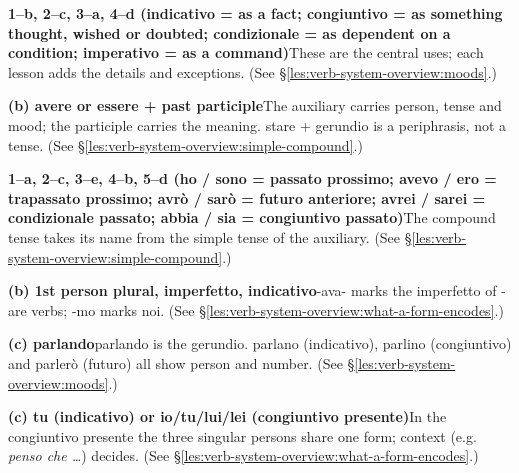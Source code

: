 \documentclass[11pt,a4paper,twoside,openright]{book}
\newcommand{\answerheading}[1]{\par\medskip\noindent{\sffamily\bfseries\small #1}\par\nopagebreak}
\begin{document}
\answerheading{\S\ref{les:verb-system-overview} Map of the verb system}\label{ans:verb-system-overview}
\begin{answers}
\item\relax \textbf{1--b, 2--c, 3--a, 4--d {\color{muted}(indicativo = as a fact; congiuntivo = as something thought, wished or doubted; condizionale = as dependent on a condition; imperativo = as a command)}}\newline These are the central uses; each lesson adds the details and exceptions. {\color{muted}(See \S\ref{les:verb-system-overview:moods}.)}
\item\relax \textbf{(b) avere or essere + past participle}\newline The auxiliary carries person, tense and mood; the participle carries the meaning. stare + gerundio is a periphrasis, not a tense. {\color{muted}(See \S\ref{les:verb-system-overview:simple-compound}.)}
\item\relax \textbf{1--a, 2--c, 3--e, 4--b, 5--d {\color{muted}(ho / sono = passato prossimo; avevo / ero = trapassato prossimo; avrò / sarò = futuro anteriore; avrei / sarei = condizionale passato; abbia / sia = congiuntivo passato)}}\newline The compound tense takes its name from the simple tense of the auxiliary. {\color{muted}(See \S\ref{les:verb-system-overview:simple-compound}.)}
\item\relax \textbf{(b) 1st person plural, imperfetto, indicativo}\newline -ava- marks the imperfetto of -are verbs; -mo marks noi. {\color{muted}(See \S\ref{les:verb-system-overview:what-a-form-encodes}.)}
\item\relax \textbf{(c) parlando}\newline parlando is the gerundio. parlano (indicativo), parlino (congiuntivo) and parlerò (futuro) all show person and number. {\color{muted}(See \S\ref{les:verb-system-overview:moods}.)}
\item\relax \textbf{(c) tu (indicativo) or io/tu/lui/lei (congiuntivo presente)}\newline In the congiuntivo presente the three singular persons share one form; context (e.g. \textit{penso che …}) decides. {\color{muted}(See \S\ref{les:verb-system-overview:what-a-form-encodes}.)}
\end{answers}
\end{document}
